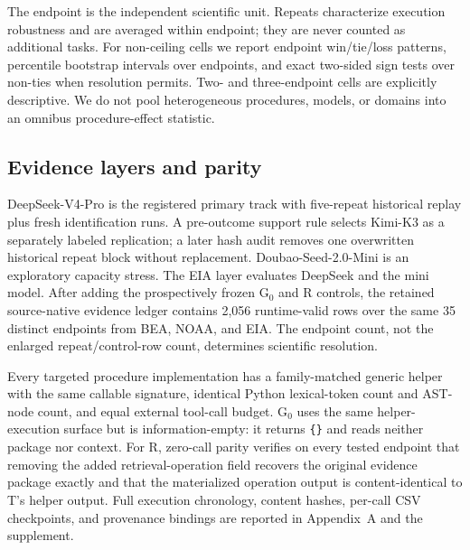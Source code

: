 The endpoint is the independent scientific unit. Repeats characterize execution robustness and are averaged within endpoint; they are never counted as additional tasks. For non-ceiling cells we report endpoint win/tie/loss patterns, percentile bootstrap intervals over endpoints, and exact two-sided sign tests over non-ties when resolution permits. Two- and three-endpoint cells are explicitly descriptive. We do not pool heterogeneous procedures, models, or domains into an omnibus procedure-effect statistic.

\subsection{Evidence layers and parity}
DeepSeek-V4-Pro is the registered primary track with five-repeat historical replay plus fresh identification runs. A pre-outcome support rule selects Kimi-K3 as a separately labeled replication; a later hash audit removes one overwritten historical repeat block without replacement. Doubao-Seed-2.0-Mini is an exploratory capacity stress. The EIA layer evaluates DeepSeek and the mini model. After adding the prospectively frozen G$_0$ and R controls, the retained source-native evidence ledger contains 2,056 runtime-valid rows over the same 35 distinct endpoints from BEA, NOAA, and EIA. The endpoint count, not the enlarged repeat/control-row count, determines scientific resolution.

Every targeted procedure implementation has a family-matched generic helper with the same callable signature, identical Python lexical-token count and AST-node count, and equal external tool-call budget. G$_0$ uses the same helper-execution surface but is information-empty: it returns \texttt{\{\}} and reads neither package nor context. For R, zero-call parity verifies on every tested endpoint that removing the added retrieval-operation field recovers the original evidence package exactly and that the materialized operation output is content-identical to T's helper output. Full execution chronology, content hashes, per-call CSV checkpoints, and provenance bindings are reported in Appendix~A and the supplement.
